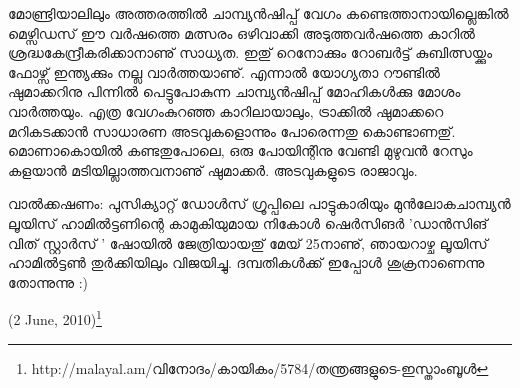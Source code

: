 മോണ്ട്രിയാലിലും അത്തരത്തില്‍ ചാമ്പ്യന്‍ഷിപ്പ് വേഗം കണ്ടെത്താനായില്ലെങ്കില്‍ മെഴ്സിഡസ് ഈ വര്‍ഷത്തെ മത്സരം 
ഒഴിവാക്കി അടുത്തവര്‍ഷത്തെ കാറില്‍ ശ്രദ്ധകേന്ദ്രീകരിക്കാനാണു് സാധ്യത. ഇതു് റെനോക്കും റോബര്‍ട്ട് കുബിത്സയ്ക്കും 
ഫോഴ്സ് ഇന്ത്യക്കും നല്ല വാര്‍ത്തയാണു്. എന്നാല്‍ യോഗ്യതാ റൗണ്ടില്‍ ഷുമാക്കറിനു പിന്നില്‍ പെട്ടുപോകുന്ന 
ചാമ്പ്യന്‍ഷിപ്പ് മോഹികള്‍ക്കു മോശം വാര്‍ത്തയും. എത്ര വേഗംകുറഞ്ഞ കാറിലായാലും, ട്രാക്കില്‍ ഷുമാക്കറെ മറികടക്കാന്‍
സാധാരണ അടവുകളൊന്നും പോരെന്നതു കൊണ്ടാണതു്. മൊണാകൊയില്‍ കണ്ടതുപോലെ, ഒരു പോയിന്റിനു വേണ്ടി 
മുഴുവന്‍ റേസും കളയാന്‍ മടിയില്ലാത്തവനാണു് ഷുമാക്കര്‍. അടവുകളുടെ രാജാവും.

വാല്‍ക്കഷണം: പുസിക്യാറ്റ് ഡോള്‍സ് ഗ്രൂപ്പിലെ പാട്ടുകാരിയും മുന്‍ലോകചാമ്പ്യന്‍ ലൂയിസ് ഹാമില്‍ട്ടണിന്റെ 
കാമുകിയുമായ നികോള്‍ ഷെര്‍സിങര്‍ 'ഡാന്‍സിങ് വിത് സ്റ്റാര്‍സ് ' ഷോയില്‍ ജേത്രിയായതു് മേയ് 25നാണു്, 
ഞായറാഴ്ച ലൂയിസ് ഹാമില്‍ട്ടണ്‍ തുര്‍ക്കിയിലും വിജയിച്ചു. ദമ്പതികള്‍ക്ക് ഇപ്പോള്‍ ശുക്രനാണെന്നു തോന്നുന്നു :)

\begin{flushright}(2 June, 2010)\footnote{http://malayal.am/വിനോദം/കായികം/5784/തന്ത്രങ്ങളുടെ-ഇസ്താംബൂള്‍}\end{flushright}

\newpage
